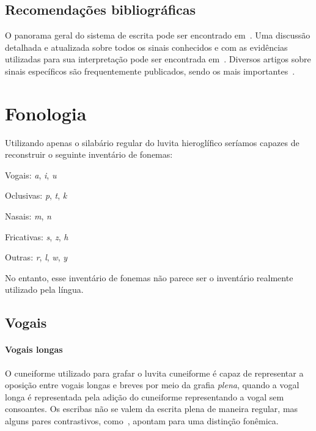 \subsection{Recomendações bibliográficas}

O panorama geral do sistema de escrita pode ser encontrado
em~\citet[p. 155ff.]{HawkinsScripts}.
Uma discussão detalhada e atualizada sobre todos os sinais conhecidos e com
as evidências utilizadas para sua interpretação pode ser encontrada
em~\citet[354--488]{CHLI3}.
Diversos artigos sobre sinais específicos são frequentemente publicados, sendo
os mais
importantes~\citet{HawkinsMorpurgoNeumann1974,Rieken2008,RiekenYakubovich2010}.

\section{Fonologia}

Utilizando apenas o silabário regular do luvita hieroglífico seríamos capazes de
reconstruir o seguinte inventário de fonemas:

\begin{compactitem}
	\item Vogais: \emph{a}, \emph{i}, \emph{u}
	\item Oclusivas: \emph{p}, \emph{t}, \emph{k}
	\item Nasais: \emph{m}, \emph{n}
	\item Fricativas: \emph{s}, \emph{z}, \emph{h}
	\item Outras: \emph{r}, \emph{l}, \emph{w}, \emph{y}
\end{compactitem}
No entanto, esse inventário de fonemas não parece ser o inventário realmente
utilizado pela língua.

\subsection{Vogais}

\paragraph{Vogais longas}
O cuneiforme utilizado para grafar o luvita cuneiforme é capaz de representar
a oposição entre vogais longas e
breves por meio da grafia \emph{plena}, quando a vogal longa é representada pela
adição do cuneiforme representando a vogal sem consoantes.
Os escribas não se valem da escrita plena de maneira regular, mas alguns pares
contrastivos, como~\Next, apontam para uma distinção fonêmica.

